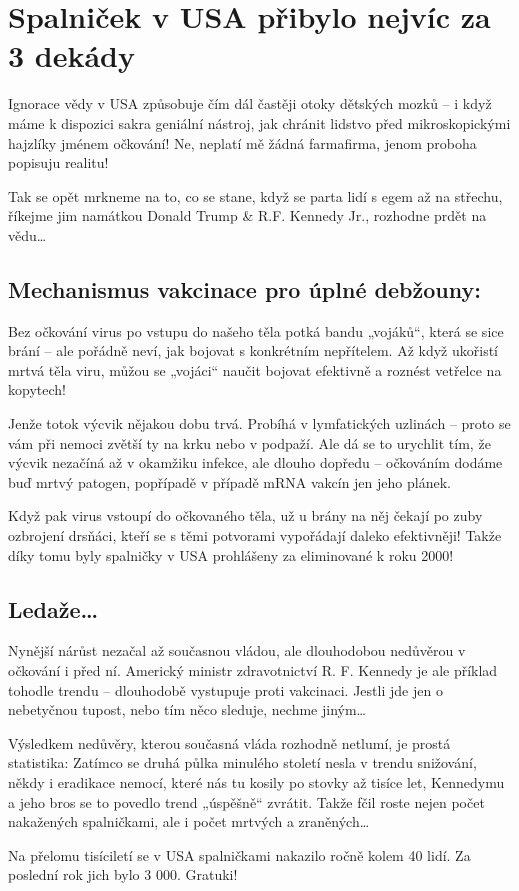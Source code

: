 \documentclass[main.tex]{subfiles}
\begin{document}
\section{Spalniček v USA přibylo nejvíc za 3 dekády}
Ignorace vědy v USA způsobuje čím dál častěji otoky dětských mozků – i když máme k dispozici sakra geniální nástroj, jak chránit lidstvo před mikroskopickými hajzlíky jménem očkování! Ne, neplatí mě žádná farmafirma, jenom proboha popisuju realitu!\par
Tak se opět mrkneme na to, co se stane, když se parta lidí s egem až na střechu, říkejme jim namátkou Donald Trump & R.F. Kennedy Jr., rozhodne prdět na vědu…
\subsection*{Mechanismus vakcinace pro úplné debžouny:}
Bez očkování virus po vstupu do našeho těla potká bandu „vojáků“, která se sice brání – ale pořádně neví, jak bojovat s konkrétním nepřítelem. Až když ukořistí mrtvá těla viru, můžou se „vojáci“ naučit bojovat efektivně a roznést vetřelce na kopytech!\par
Jenže totok výcvik nějakou dobu trvá. Probíhá v lymfatických uzlinách – proto se vám při nemoci zvětší ty na krku nebo v podpaží. Ale dá se to urychlit tím, že výcvik nezačíná až v okamžiku infekce, ale dlouho dopředu – očkováním dodáme buď mrtvý patogen, popřípadě v případě mRNA vakcín jen jeho plánek. \par
Když pak virus vstoupí do očkovaného těla, už u brány na něj čekají po zuby ozbrojení drsňáci, kteří se s těmi potvorami vypořádají daleko efektivněji! Takže díky tomu byly spalničky v USA prohlášeny za eliminované k roku 2000!
\subsection*{Ledaže…}
Nynější nárůst nezačal až současnou vládou, ale dlouhodobou nedůvěrou v očkování i před ní. Americký ministr zdravotnictví R. F. Kennedy je ale příklad tohodle trendu – dlouhodobě vystupuje proti vakcinaci. Jestli jde jen o nebetyčnou tupost, nebo tím něco sleduje, nechme jiným…\par
Výsledkem nedůvěry, kterou současná vláda rozhodně netlumí, je prostá statistika: Zatímco se druhá půlka minulého století nesla v trendu snižování, někdy i eradikace nemocí, které nás tu kosily po stovky až tisíce let, Kennedymu a jeho bros se to povedlo trend „úspěšně“ zvrátit. Takže fčil roste nejen počet nakažených spalničkami, ale i počet mrtvých a zraněných…\par
Na přelomu tisíciletí se v USA spalničkami nakazilo ročně kolem 40 lidí. Za poslední rok jich bylo 3 000. Gratuki!
\end{document}

